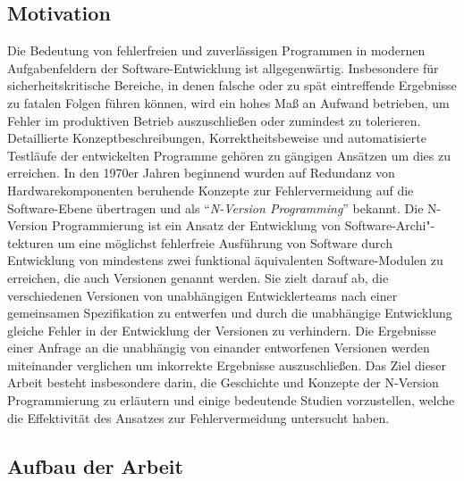 \subsection{Motivation}\label{motivation}

Die Bedeutung von fehlerfreien und zuverlässigen Programmen in modernen Aufgabenfeldern der Software-Entwicklung ist allgegenwärtig.
Insbesondere für sicherheitskritische Bereiche, in denen falsche oder zu spät eintreffende Ergebnisse zu fatalen Folgen führen können, wird ein hohes Maß an Aufwand betrieben, um Fehler im produktiven Betrieb auszuschließen oder zumindest zu tolerieren.
Detaillierte Konzeptbeschreibungen, Korrektheitsbeweise und automatisierte Testläufe der entwickelten Programme gehören zu gängigen Ansätzen um dies zu erreichen.
In den 1970er Jahren beginnend wurden auf Redundanz von Hardwarekomponenten beruhende Konzepte zur Fehlervermeidung auf die Software-Ebene übertragen und als \enquote{\emph{N-Version Programming}} \cite{Chen1978} bekannt.
Die N-Version Programmierung ist ein Ansatz der Entwicklung von Software-Archi"-tekturen um eine möglichst fehlerfreie Ausführung von Software durch Entwicklung von mindestens zwei funktional äquivalenten Software-Modulen zu erreichen, die auch Versionen genannt werden.
Sie zielt darauf ab, die verschiedenen Versionen von unabhängigen Entwicklerteams nach einer gemeinsamen Spezifikation zu entwerfen und durch die unabhängige Entwicklung gleiche Fehler in der Entwicklung der Versionen zu verhindern.
Die Ergebnisse einer Anfrage an die unabhängig von einander entworfenen Versionen werden miteinander verglichen um inkorrekte Ergebnisse auszuschließen.
Das Ziel dieser Arbeit besteht insbesondere darin, die Geschichte und Konzepte der N-Version Programmierung zu erläutern und einige bedeutende Studien vorzustellen, welche die Effektivität des Ansatzes zur Fehlervermeidung untersucht haben.


\subsection{Aufbau der Arbeit}\label{aufbau}


